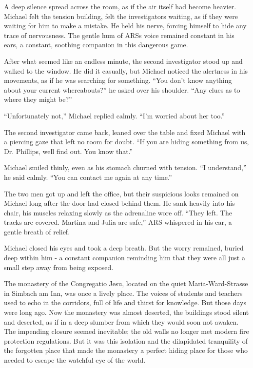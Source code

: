 \documentclass[
]{article}
\begin{document}
A deep silence spread across the room, as if the air itself had become
heavier. Michael felt the tension building, felt the investigators
waiting, as if they were waiting for him to make a mistake. He held his
nerve, forcing himself to hide any trace of nervousness. The gentle hum
of ARS\textquotesingle s voice remained constant in his ears, a
constant, soothing companion in this dangerous game.

After what seemed like an endless minute, the second investigator stood
up and walked to the window. He did it casually, but Michael noticed the
alertness in his movements, as if he was searching for something. ``You
don't know anything about your current whereabouts?'' he asked over his
shoulder. ``Any clues as to where they might be?''

``Unfortunately not,'' Michael replied calmly. ``I'm worried about her
too.''

The second investigator came back, leaned over the table and fixed
Michael with a piercing gaze that left no room for doubt. ``If you are
hiding something from us, Dr. Phillips, we\textquotesingle ll find out.
You know that.''

Michael smiled thinly, even as his stomach churned with tension. ``I
understand,'' he said calmly. ``You can contact me again at any time.''

The two men got up and left the office, but their suspicious looks
remained on Michael long after the door had closed behind them. He sank
heavily into his chair, his muscles relaxing slowly as the adrenaline
wore off. ``They left. The tracks are covered. Martina and Julia are
safe,'' ARS whispered in his ear, a gentle breath of relief.

Michael closed his eyes and took a deep breath. But the worry remained,
buried deep within him - a constant companion reminding him that they
were all just a small step away from being exposed.

The monastery of the Congregatio Jesu, located on the quiet
Maria-Ward-Strasse in Simbach am Inn, was once a lively place. The
voices of students and teachers used to echo in the corridors, full of
life and thirst for knowledge. But those days were long ago. Now the
monastery was almost deserted, the buildings stood silent and deserted,
as if in a deep slumber from which they would soon not awaken. The
impending closure seemed inevitable; the old walls no longer met modern
fire protection regulations. But it was this isolation and the
dilapidated tranquility of the forgotten place that made the monastery a
perfect hiding place for those who needed to escape the watchful eye of
the world.
\end{document}
